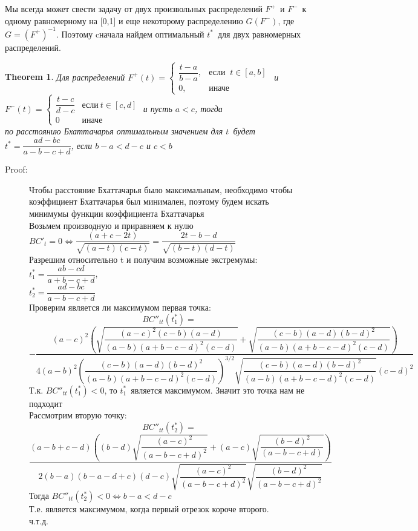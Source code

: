 \documentclass[12 pt, russian]{article}
\newtheorem{theorem}{Theorem}
\begin{document}
Мы всегда может свести задачу от двух произвольных распределений $F^+$\ и $F^-$\ к одному равномерному на [0,1] и еще некоторому распределению $G(F^-)$, где $G=(F^+)^{-1}$. Поэтому cначала найдем оптимальный $t^*$\ для двух равномерных распределений.
\begin{theorem}
  Для распределений $F^+(t) =\begin{cases}
\dfrac{t-a}{b-a},&\text{если $\ t \in [a,b]$}\\
0,&\text{иначе}
\end{cases} $\ и \\$F^-(t) =\begin{cases}
\dfrac{t-c}{d-c}&\text{если$\ t \in [c,d]$}\\
0&\text{иначе}
\end{cases} $ и пусть $a<c$, тогда\\
по расстоянию Бхаттачарья оптимальным значением для $t$\ будет $t^* = \dfrac{ad-bc}{a-b-c+d} $, если $b-a<d-c$ и $c<b$
 \end{theorem}
 \begin{description}
\item[Proof:] 
Чтобы расстояние Бхаттачарья было максимальным, необходимо чтобы коэффициент Бхаттачарья был минимален, поэтому будем искать минимумы функции коэффициента Бхаттачарья\\ 
Возьмем производную и приравняем к нулю\\
$BC'_t =  0 \Leftrightarrow \dfrac{(a+c-2t)}{\sqrt{(a-t)(c-t)}} = \dfrac{2t-b-d}{\sqrt{(b-t)(d-t)}} $\\
Разрешим относительно t и получим возможные экстремумы:\\

$t^*_1 = \dfrac{ab-cd}{a+b-c+d}$,\\
$t^*_2 = \dfrac{ad-bc}{a-b-c+d}$\\
Проверим является ли максимумом первая точка:\\
$$BC''_{tt}(t^*_1) = $$
$$-\dfrac{(a-c)^2(\sqrt{\dfrac{(a-c)^2(c-b)(a-d)}{(a-b)(a+b-c-d)^2(c-d)}}+\sqrt{\dfrac{(c-b)(a-d)(b-d)^2}{(a-b)(a+b-c-d)^2(c-d)}})}{4(a-b)^2(\dfrac{(c-b)(a-d)(b-d)^2}{(a-b)(a+b-c-d)^2(c-d)})^{3/2}\sqrt{\dfrac{(c-b)(a-d)(b-d)^2}{(a-b)(a+b-c-d)^2(c-d)}}(c-d)^2}$$ 
Т.к. $BC''_{tt}(t^*_1)<0$, то $t^*_1$\ является максимумом. Значит это точка нам не подходит\\
Рассмотрим вторую точку:\\
$$BC''_{tt}(t^*_2) = $$ 
$$\dfrac{(a-b+c-d)((b-d)\sqrt{\dfrac{(a-c)^2}{(a-b-c+d)^2}}+(a-c)\sqrt{\dfrac{(b-d)^2}{(a-b-c+d)}})}{2(b-a)(b-a-d+c)(d-c)\sqrt{\dfrac{(a-c)^2}{(a-b-c+d)^2}}\sqrt{\dfrac{(b-d)^2}{(a-b-c+d)^2}}}$$ 
Тогда $BC''_{tt}(t^*_2)<0 \Leftrightarrow b-a<d-c$\\
Т.е. является максимумом, когда первый отрезок короче второго.\\
ч.т.д.
\end{description}
\end{document}
